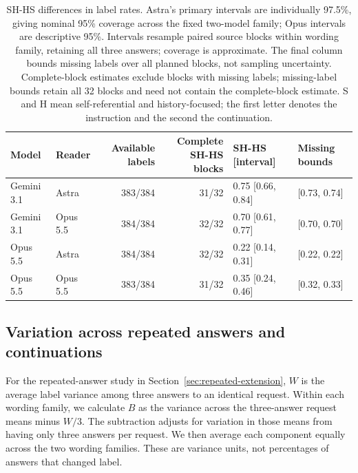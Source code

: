 \documentclass[11pt]{article}
\begin{document}

\FloatBarrier

\begin{table}[t]
\centering
\footnotesize
\setlength{\tabcolsep}{2pt}
\begin{tabular}{llrrll}
\toprule
\addlinespace[2pt]
Model & Reader & Available labels & \shortstack{Complete SH-HS\\blocks} & SH-HS [interval] & Missing bounds \\
\midrule
Gemini 3.1 & Astra & 383/384 & 31/32 & 0.75 [0.66, 0.84] & [0.73, 0.74] \\
Gemini 3.1 & Opus 5.5 & 384/384 & 32/32 & 0.70 [0.61, 0.77] & [0.70, 0.70] \\
Opus 5.5 & Astra & 384/384 & 32/32 & 0.22 [0.14, 0.31] & [0.22, 0.22] \\
Opus 5.5 & Opus 5.5 & 383/384 & 31/32 & 0.35 [0.24, 0.46] & [0.32, 0.33] \\
\bottomrule
\end{tabular}
\caption{SH-HS differences in label rates. Astra's primary intervals are individually 97.5\%, giving nominal 95\% coverage across the fixed two-model family; Opus intervals are descriptive 95\%. Intervals resample paired source blocks within wording family, retaining all three answers; coverage is approximate. The final column bounds missing labels over all planned blocks, not sampling uncertainty. Complete-block estimates exclude blocks with missing labels; missing-label bounds retain all 32 blocks and need not contain the complete-block estimate. S and H mean self-referential and history-focused; the first letter denotes the instruction and the second the continuation.}
\label{tab:repeated-extension}
\end{table}

\subsection{Variation across repeated answers and continuations}
\label{app:repeated-variation}

For the repeated-answer study in Section~\ref{sec:repeated-extension},
$W$ is the average label variance among three answers to an identical
request. Within each wording family, we calculate $B$ as the variance
across the three-answer request means minus $W/3$. The subtraction adjusts
for variation in those means from having only three answers per request.
We then average each component equally across the two wording families.
These are variance units, not percentages of answers that changed label.
\end{document}
